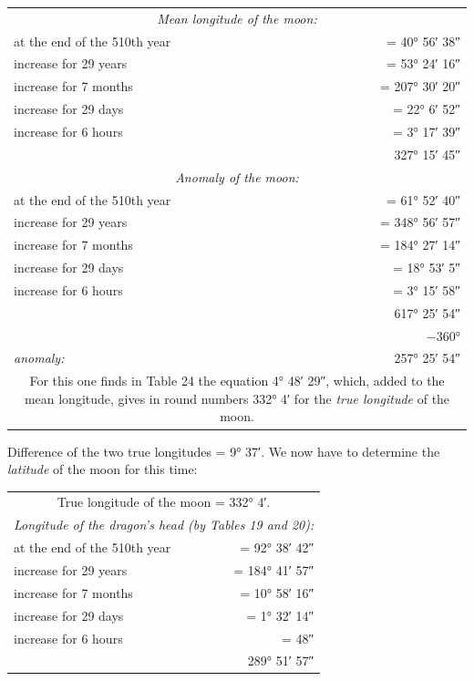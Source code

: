 \documentclass[11pt]{article}
\begin{document}
\addtocounter{footnoteT}{-1}
\begin{center}\small\begin{tabular}{lr}
\multicolumn{2}{c}{\emph{\emph{Mean longitude of the moon:}}} \\
at the end of the 510th year & = 40° 56′ 38″ \\
increase for 29 years & = 53° 24′ 16″ \\
increase for 7 months & = 207° 30′ 20″ \\
increase for 29 days & = 22° 6′ 52″ \\
increase for 6 hours & = 3° 17′ 39″ \\
 & 327° 15′ 45″ \\
\multicolumn{2}{c}{\emph{\emph{Anomaly of the moon:}}} \\
at the end of the 510th year & = 61° 52′ 40″ \\
increase for 29 years & = 348° 56′ 57″ \\
increase for 7 months & = 184° 27′ 14″ \\
increase for 29 days & = 18° 53′ 5″ \\
increase for 6 hours & = 3° 15′ 58″ \\
 & 617° 25′ 54″ \\
 & −360° \\
\emph{anomaly:} & 257° 25′ 54″ \\
\multicolumn{2}{c}{For this one finds in Table 24 the equation 4° 48′ 29″, which, added to the mean longitude, gives in round numbers 332° 4′ for the \emph{true longitude} of the moon.} \\
\end{tabular}\end{center}
\par Difference of the two true longitudes = 9° 37′. We now have to determine the \emph{latitude} of the moon for this time:\par
\begin{center}\small\begin{tabular}{lr}
\multicolumn{2}{c}{True longitude of the moon = 332° 4′.} \\
\multicolumn{2}{c}{\emph{Longitude of the dragon's head (by Tables 19 and 20):}} \\
at the end of the 510th year & = 92° 38′ 42″ \\
increase for 29 years & = 184° 41′ 57″ \\
increase for 7 months & = 10° 58′ 16″ \\
increase for 29 days & = 1° 32′ 14″ \\
increase for 6 hours & = 48″ \\
 & 289° 51′ 57″ \\
\end{tabular}\end{center}
\end{document}
